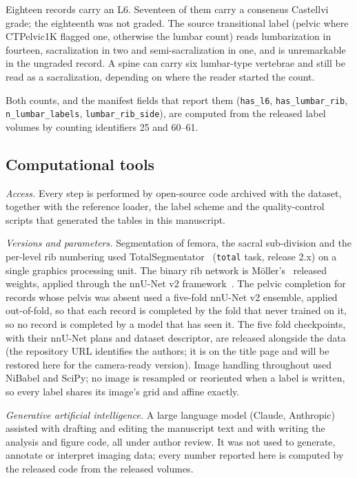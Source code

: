 \documentclass[aapm,mph,amsmath,amssymb,reprint]{revtex4-2}
\newif\ifreview \reviewtrue
\begin{document}
Eighteen records carry an L6. Seventeen of them carry a consensus Castellvi grade;
the eighteenth was not graded. The source transitional label (pelvic where CTPelvic1K flagged one, otherwise the lumbar count) reads lumbarization in fourteen, sacralization in two and semi-sacralization in one, and is unremarkable in the ungraded record. A spine can carry six lumbar-type vertebrae and still be read as a sacralization, depending on where the reader started the count.

Both counts, and the manifest fields that report them (\texttt{has\_l6},
\texttt{has\_lumbar\_rib}, \texttt{n\_lumbar\_labels}, \texttt{lumbar\_rib\_side}), are
computed from the released label volumes by counting identifiers 25 and 60--61.

\subsection{Computational tools}

\emph{Access.} Every step is performed by open-source code archived with the dataset,
together with the reference loader, the label scheme and the quality-control scripts that
generated the tables in this manuscript.

\emph{Versions and parameters.} Segmentation of femora, the sacral sub-division and the
per-level rib numbering used TotalSegmentator~\cite{totalsegmentator} (\texttt{total} task,
release 2.x) on a single graphics processing unit. The binary rib network is
M\"oller's~\cite{moller2026} released weights, applied through the nnU-Net v2
framework~\cite{nnunet}. The pelvic completion for records whose pelvis was absent used a
five-fold nnU-Net v2 ensemble, applied out-of-fold, so that each record is completed by the fold that
never trained on it, so no record is completed by a model that has seen it. The five fold
checkpoints, with their nnU-Net plans and dataset descriptor, are released alongside the
data (\ifreview the repository URL identifies the authors; it is on the title page and will be
restored here for the camera-ready version\else\url{https://huggingface.co/OpenSpineConsortium/spinopelvic-seg-checkpoints}\fi). Image handling
throughout used NiBabel and SciPy; no image is resampled or reoriented when a label is
written, so every label shares its image's grid and affine exactly.

\emph{Generative artificial intelligence.} A large language model (Claude, Anthropic)
assisted with drafting and editing the manuscript text and with writing the analysis and
figure code, all under author review. It was not used to generate, annotate or interpret
imaging data; every number reported here is computed by the released code from the
released volumes.
\end{document}
